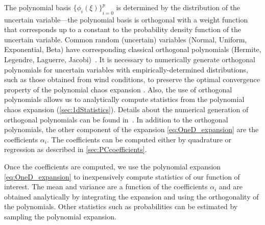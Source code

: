 The polynomial basis $ {\{\phi_i(\xi)\}}_{i=0}^p $ is determined by the distribution of the uncertain variable---the polynomial basis is orthogonal with a weight function that corresponds up to a constant to the probability density function of the uncertain variable. Common random (uncertain) variables (Normal, Uniform, Exponential, Beta) have corresponding classical orthogonal polynomials (Hermite, Legendre, Laguerre, Jacobi)~\cite{Eldred2008}. %
It is necessary to numerically generate orthogonal polynomials for uncertain variables with empirically-determined distributions, such as those obtained from wind conditions, to preserve the optimal convergence property of the polynomial chaos expansion \cite{Oladyshkin2012}. Also, the use of orthogonal polynomials allows us to analytically compute statistics from the polynomial chaos expansion (\cref{sec:1dStatistics}). Details about the numerical generation of orthogonal polynomials can be found in~\cite{Padron2017}. In addition to the orthogonal polynomials, the other component of the expansion \cref{eq:OneD_expansion} are the coefficients $\alpha_i$. The coefficients can be computed either by quadrature or regression as described in \cref{sec:PCcoefficients}.

Once the coefficients are computed, we use the polynomial expansion \cref{eq:OneD_expansion} to inexpensively compute statistics of our function of interest. The mean and variance are a function of the coefficients $\alpha_i$ and are obtained analytically by integrating the expansion and using the orthogonality of the polynomials. Other statistics such as probabilities can be estimated by sampling the polynomial expansion.

